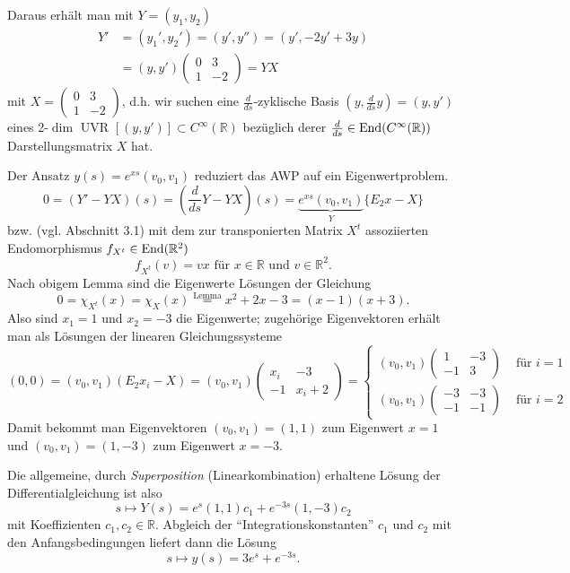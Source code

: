 	Daraus erhält man mit $ Y= (y_1,y_2) $
	  \begin{align*}
		 Y' &= (y_1',y_2') = (y',y'') = (y',-2y'+3y)\\
		 &= (y,y') \begin{pmatrix}
		 	0 & 3\\ 1 & -2
		 \end{pmatrix} = YX
	  \end{align*}
	mit $ X= \begin{pmatrix}
	0 & 3\\ 1 & -2
	\end{pmatrix}$, d.h. wir suchen eine $ \frac{d}{ds} $-zyklische Basis $ (y,\frac{d}{ds}y) = (y,y') $ eines 2-$ \dim $ UVR $ [(y,y')]\subset C^\infty(\mathbb{R}) $ bezüglich derer $ \frac{d}{ds}\in \operatorname{End}(C^\infty(\mathbb{R})) $ Darstellungsmatrix $ X $ hat.
	
	Der Ansatz $ y(s) = e^{xs} (v_0,v_1)$ reduziert das AWP auf ein Eigenwertproblem.
		\[ 0 = \left(Y'-YX\right)(s) = \left(\frac{d}{ds}Y - YX\right)(s) = \underset{Y}{\underbrace{e^{xs}(v_0,v_1)}} \{E_2x-X\}\]
	bzw. (vgl. Abschnitt 3.1) mit dem zur transponierten Matrix $ X^t $ assoziierten Endomorphismus $ f_{X^t}\in \operatorname{End}(\mathbb{R}^2) $
		\[ f_{X^t}(v) = vx \text{ für }x\in\mathbb{R} \text{ und }v\in \mathbb{R}^2. \]
	Nach obigem Lemma sind die Eigenwerte Lösungen der Gleichung
		\[ 0 = \chi_{X^t}(x) = \chi_X(x) \overset{\text{Lemma}}{=} x^2+2x-3 = (x-1)(x+3). \]
	Also sind $ x_1 = 1 $ und $ x_2 = -3 $ die Eigenwerte; zugehörige Eigenvektoren erhält man als Lösungen der linearen Gleichungssysteme
		\[ (0,0) = (v_0,v_1)(E_2x_i-X)= (v_0,v_1)\begin{pmatrix}
		x_i&-3\\-1&x_i+2
		\end{pmatrix} = \begin{cases}
		(v_0,v_1)\begin{pmatrix}
		1&-3\\-1&3
		\end{pmatrix}& \text{ für } i = 1\\
		(v_0,v_1)\begin{pmatrix}
		-3&-3\\-1&-1
		\end{pmatrix}& \text{ für } i = 2
		\end{cases} \]
	Damit bekommt man Eigenvektoren $ (v_0,v_1) = (1,1) $ zum Eigenwert $ x=1 $ und $ (v_0,v_1) = (1,-3) $ zum Eigenwert $ x = -3 $.
	
	Die allgemeine, durch \emph{Superposition} (Linearkombination) erhaltene Lösung der Differentialgleichung ist also
		\[ s\mapsto Y(s) = e^s(1,1)c_1 + e^{-3s}(1,-3)c_2 \]
	mit Koeffizienten $ c_1,c_2 \in \mathbb{R} $. Abgleich der "`Integrationskonstanten"' $ c_1 $ und $ c_2 $ mit den Anfangsbedingungen liefert dann die Lösung
		\[ s \mapsto y(s) = 3e^s+e^{-3s}. \]
